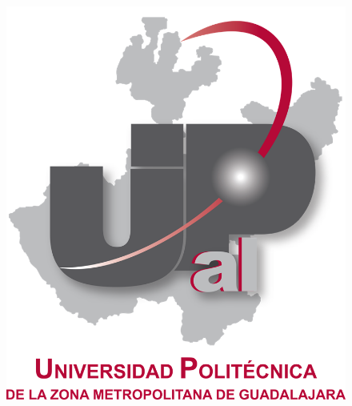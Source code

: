 \documentclass[12pt]{article}
\begin{document}
\begin{figure}[H]
	\begin{Center}
		\includegraphics[width=5.06in,height=5.51in]{./media/image1.png}
	\end{Center}
\end{figure}



\par


\vspace{\baselineskip}

\vspace{\baselineskip}

\vspace{\baselineskip}

\vspace{\baselineskip}

\vspace{\baselineskip}

\vspace{\baselineskip}

\vspace{\baselineskip}

\vspace{\baselineskip}
\end{document}
